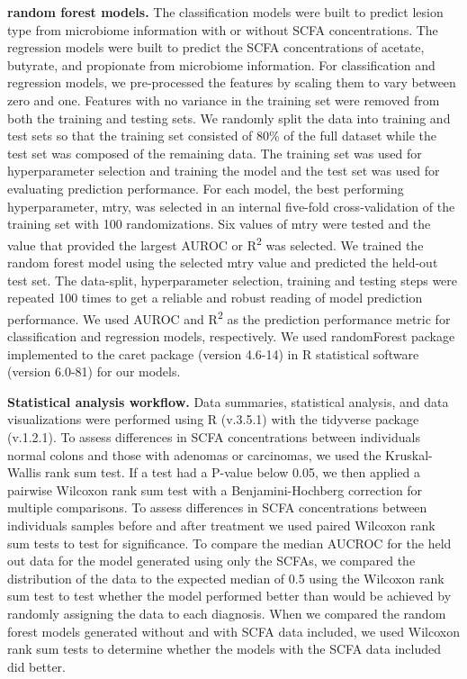 \documentclass[11pt,]{article}
\begin{document}
\textbf{random forest models.} The classification models were built to
predict lesion type from microbiome information with or without SCFA
concentrations. The regression models were built to predict the SCFA
concentrations of acetate, butyrate, and propionate from microbiome
information. For classification and regression models, we pre-processed
the features by scaling them to vary between zero and one. Features with
no variance in the training set were removed from both the training and
testing sets. We randomly split the data into training and test sets so
that the training set consisted of 80\% of the full dataset while the
test set was composed of the remaining data. The training set was used
for hyperparameter selection and training the model and the test set was
used for evaluating prediction performance. For each model, the best
performing hyperparameter, mtry, was selected in an internal five-fold
cross-validation of the training set with 100 randomizations. Six values
of mtry were tested and the value that provided the largest AUROC or
R\textsuperscript{2} was selected. We trained the random forest model
using the selected mtry value and predicted the held-out test set. The
data-split, hyperparameter selection, training and testing steps were
repeated 100 times to get a reliable and robust reading of model
prediction performance. We used AUROC and R\textsuperscript{2} as the
prediction performance metric for classification and regression models,
respectively. We used randomForest package implemented to the caret
package (version 4.6-14) in R statistical software (version 6.0-81) for
our models.

\textbf{Statistical analysis workflow.} Data summaries, statistical
analysis, and data visualizations were performed using R (v.3.5.1) with
the tidyverse package (v.1.2.1). To assess differences in SCFA
concentrations between individuals normal colons and those with adenomas
or carcinomas, we used the Kruskal-Wallis rank sum test. If a test had a
P-value below 0.05, we then applied a pairwise Wilcoxon rank sum test
with a Benjamini-Hochberg correction for multiple comparisons. To assess
differences in SCFA concentrations between individuals samples before
and after treatment we used paired Wilcoxon rank sum tests to test for
significance. To compare the median AUCROC for the held out data for the
model generated using only the SCFAs, we compared the distribution of
the data to the expected median of 0.5 using the Wilcoxon rank sum test
to test whether the model performed better than would be achieved by
randomly assigning the data to each diagnosis. When we compared the
random forest models generated without and with SCFA data included, we
used Wilcoxon rank sum tests to determine whether the models with the
SCFA data included did better.
\end{document}
